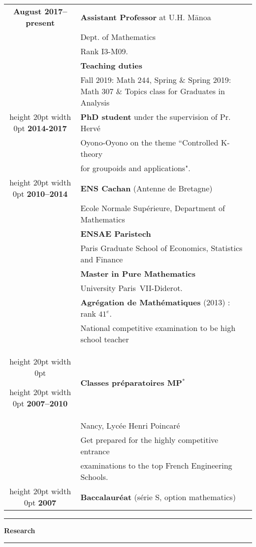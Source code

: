 \documentclass[a4paper,11pt]{article}
\newcommand\espace{\vrule height 20pt width 0pt}
\newcommand{\titre}[1]{%
	\begin{center}
	\bigskip
	\rule{\textwidth}{1pt}
	\par\vspace{0.1cm}
        \textbf{\large #1}
	\par\rule{\textwidth}{1pt}
	\end{center}
	\bigskip
	}
\begin{document}
\begin{tabular}{cp{}}

\textbf{August 2017--present} &  \textbf{Assistant Professor} at U.H. M\={a}noa  \\
						& Dept. of Mathematics\\
						& Rank I3-M09. \\
						& \textbf{Teaching duties} \\
						& Fall 2019: Math 244, Spring \& Spring 2019: Math 307 \& Topics class for Graduates in Analysis\\ 
\espace
\textbf{2014-2017} &  \textbf{PhD student} under the supervision of Pr. Hervé  \\
						& Oyono-Oyono on the theme ``Controlled K-theory \\
						& for groupoids and applications". \\
\espace
\textbf{2010--2014} &  \textbf{ENS Cachan} (Antenne de Bretagne) \\
				    & 	Ecole Normale Supérieure, Department of Mathematics \\
                              & \textbf{ENSAE Paristech}\\
				&	Paris Graduate School of Economics, Statistics and Finance\\
                                   & \textbf{Master in Pure Mathematics}\\  & University Paris~VII-Diderot. \\
                                   & \textbf{Agrégation de Mathématiques} (2013) : rank $41^e$. \\
				& National competitive examination to be high school teacher\\
\espace

\espace
\textbf{2007--2010} &\textbf{Classes préparatoires MP$^*$ } \\
					& Nancy, Lycée Henri Poincaré\\
					& Get prepared for the highly competitive entrance \\
				& examinations to the top French Engineering Schools.\\

\espace
\textbf{2007} & \textbf{Baccalauréat} (série S, option mathematics) 
 \\

\end{tabular}

\newpage
\titre{Research}
\end{document}
